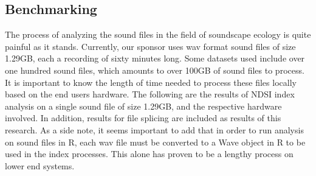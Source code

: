 \subsection{Benchmarking}
The process of analyzing the sound files in the field of soundscape ecology is quite painful as it stands. Currently, our sponsor uses wav format sound files of size 1.29GB, each a recording of sixty minutes long. Some datasets used include over one hundred sound files, which amounts to over 100GB of sound files to process. It is important to know the length of time needed to process these files locally based on the end user\textquotesingle s hardware. The following are the results of NDSI index analysis on a single sound file of size 1.29GB, and the respective hardware involved. In addition, results for file splicing are included as results of this research. As a side note, it seems important to add that in order to run analysis on sound files in R, each wav file must be converted to a Wave object in R to be used in the index processes. This alone has proven to be a lengthy process on lower end systems.\\





